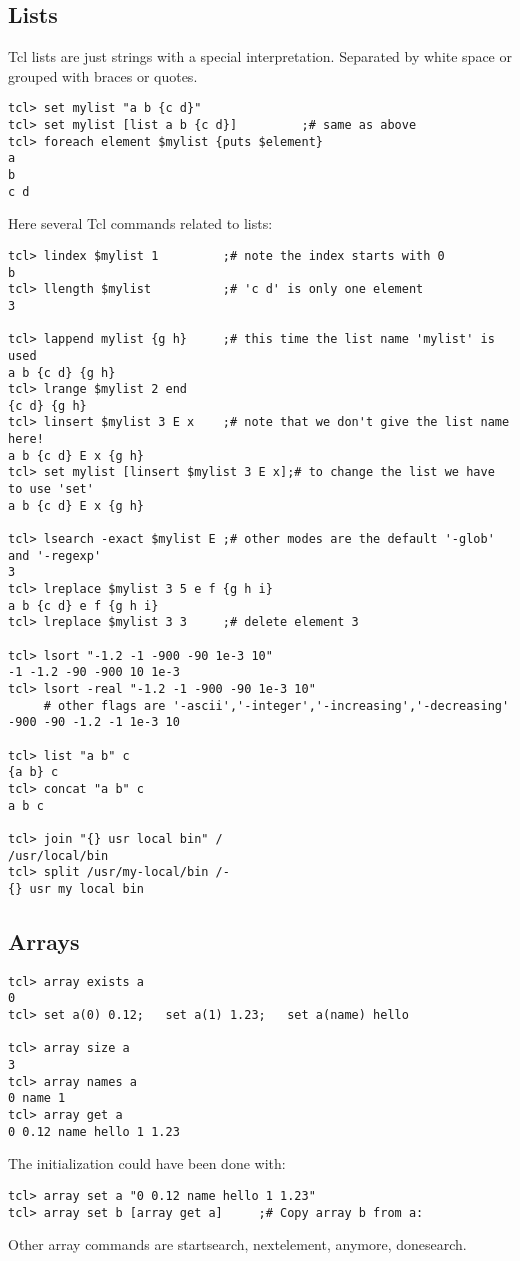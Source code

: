 \subsection*{Lists}

Tcl lists are just strings with a special interpretation. Separated by
white space or grouped with braces or quotes.

\begin{verbatim}
tcl> set mylist "a b {c d}"
tcl> set mylist [list a b {c d}]         ;# same as above
tcl> foreach element $mylist {puts $element}
a
b
c d
\end{verbatim}

Here several Tcl commands related to lists:

\begin{verbatim}
tcl> lindex $mylist 1         ;# note the index starts with 0
b
tcl> llength $mylist          ;# 'c d' is only one element
3

tcl> lappend mylist {g h}     ;# this time the list name 'mylist' is used
a b {c d} {g h}
tcl> lrange $mylist 2 end
{c d} {g h}
tcl> linsert $mylist 3 E x    ;# note that we don't give the list name here!
a b {c d} E x {g h}
tcl> set mylist [linsert $mylist 3 E x];# to change the list we have to use 'set'
a b {c d} E x {g h}

tcl> lsearch -exact $mylist E ;# other modes are the default '-glob' and '-regexp'
3
tcl> lreplace $mylist 3 5 e f {g h i} 
a b {c d} e f {g h i}
tcl> lreplace $mylist 3 3     ;# delete element 3

tcl> lsort "-1.2 -1 -900 -90 1e-3 10"
-1 -1.2 -90 -900 10 1e-3
tcl> lsort -real "-1.2 -1 -900 -90 1e-3 10"
     # other flags are '-ascii','-integer','-increasing','-decreasing'
-900 -90 -1.2 -1 1e-3 10

tcl> list "a b" c
{a b} c
tcl> concat "a b" c
a b c

tcl> join "{} usr local bin" /
/usr/local/bin
tcl> split /usr/my-local/bin /-
{} usr my local bin
\end{verbatim}

\subsection*{Arrays}

\begin{verbatim}
tcl> array exists a
0
tcl> set a(0) 0.12;   set a(1) 1.23;   set a(name) hello  

tcl> array size a
3
tcl> array names a
0 name 1
tcl> array get a 
0 0.12 name hello 1 1.23
\end{verbatim}

The initialization could have been done with:

\begin{verbatim}
tcl> array set a "0 0.12 name hello 1 1.23"
tcl> array set b [array get a]     ;# Copy array b from a:
\end{verbatim}

Other array commands are startsearch, nextelement, anymore,
donesearch.

